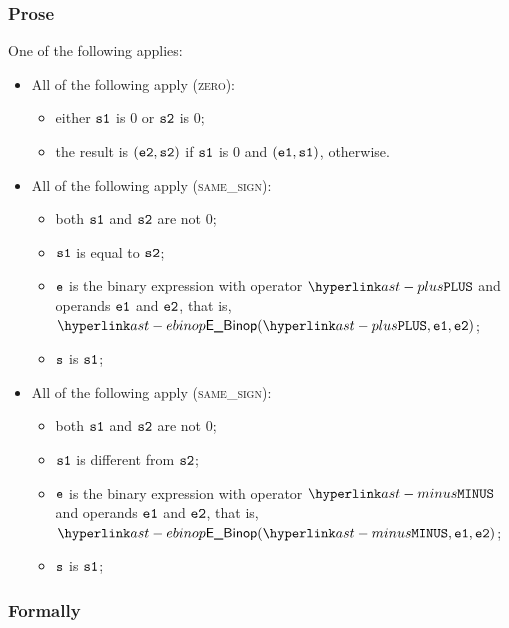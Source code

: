 \subsubsection{Prose}
One of the following applies:
\begin{itemize}
  \item All of the following apply (\textsc{zero}):
  \begin{itemize}
    \item either $\texttt{s1}$ is $0$ or $\texttt{s2}$ is $0$;
    \item the result is $(\texttt{e2}, \texttt{s2})$ if $\texttt{s1}$ is $0$ and $(\texttt{e1}, \texttt{s1})$, otherwise.
  \end{itemize}

  \item All of the following apply (\textsc{same\_sign}):
  \begin{itemize}
    \item both $\texttt{s1}$ and $\texttt{s2}$ are not $0$;
    \item $\texttt{s1}$ is equal to $\texttt{s2}$;
    \item $\texttt{e}$ is the binary expression with operator $\PLUS$ and operands $\texttt{e1}$ and $\texttt{e2}$,
          that is, $\EBinop(\PLUS, \veone, \vetwo)$;
    \item $\texttt{s}$ is $\texttt{s1}$;
  \end{itemize}

  \item All of the following apply (\textsc{same\_sign}):
  \begin{itemize}
    \item both $\texttt{s1}$ and $\texttt{s2}$ are not $0$;
    \item $\texttt{s1}$ is different from $\texttt{s2}$;
    \item $\texttt{e}$ is the binary expression with operator $\MINUS$ and operands $\texttt{e1}$ and $\texttt{e2}$,
          that is, $\EBinop(\MINUS, \veone, \vetwo)$;
    \item $\texttt{s}$ is $\texttt{s1}$;
  \end{itemize}
\end{itemize}

\subsubsection{Formally}

